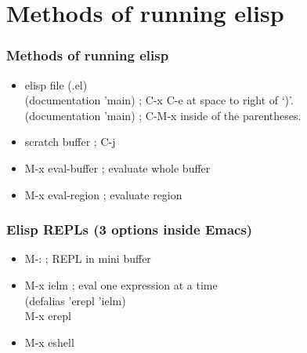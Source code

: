 \documentclass[aspectratio=169]{beamer}
\begin{document}
\section{Methods of running elisp}

\begin{frame}
\frametitle{Methods of running elisp}
\Large{
\begin{itemize}[font=$\bullet$\scshape\bfseries]
    \item elisp file (.el)\\
    (documentation 'main) ; C-x C-e at space to right of `)'.\\
    (documentation 'main) ; C-M-x inside of the parentheses.
    \vspace{4mm}    
    \item scratch buffer ; C-j
    \vspace{4mm}
    \item M-x eval-buffer ; evaluate whole buffer
    \item M-x eval-region ; evaluate region
\end{itemize}
}
\end{frame}



\begin{frame}
\frametitle{Elisp REPLs (3 options inside Emacs)}
\Large{
\begin{itemize}[font=$\bullet$\scshape\bfseries]
    \item M-: ; REPL in mini buffer
    \vspace{4mm}    
    \item M-x ielm ; eval one expression at a time\\
       (defalias 'erepl 'ielm) \\
    M-x erepl
    \vspace{4mm}
     \item M-x eshell
\end{itemize}}
\end{frame}
\end{document}
